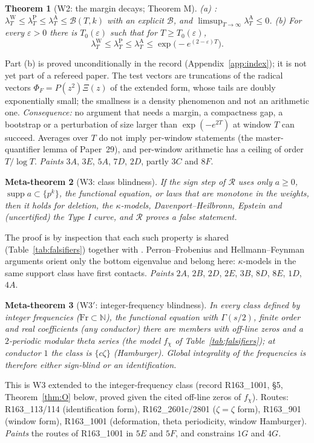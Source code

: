 \documentclass[11pt]{amsart}
\newtheorem{theorem}{Theorem}[section]
\newtheorem{metatheorem}[theorem]{Meta-theorem}
\theoremstyle{definition}
\theoremstyle{remark}
\newcommand{\N}{\mathbb N}
\newcommand{\supp}{\operatorname{supp}}
\newcommand{\lamA}{\lambda^{\mathrm A}_T}
\newcommand{\lamW}{\lambda^{\mathrm W}_T}
\begin{document}
\begin{theorem}[W2: the margin decays; Theorem M]\label{thm:M}
(a) \cite[Thm.~11.5]{Paper47}: $\lamW\le\lambda^{\mathrm P}_T\le\lamA\le\mathcal B(T,k)$ with an
explicit $\mathcal B$, and $\limsup_{T\to\infty}\lamA\le0$.
(b) For every $\varepsilon>0$ there is $T_0(\varepsilon)$ such that for $T\ge T_0(\varepsilon)$,
\[
\lamW\le\lambda^{\mathrm P}_T\le\lamA\le\exp\!\big(-e^{(2-\varepsilon)T}\big).
\]
\end{theorem}
\noindent Part (b) is proved unconditionally in the record (Appendix~\ref{app:index}); it is not yet part of a
refereed paper. The test vectors are truncations of the radical vectors $\Phi_F=P(z^2)\Xi(z)$ of the
extended form, whose tails are doubly exponentially small; the smallness is a density phenomenon and not
an arithmetic one. \emph{Consequence:} no argument that needs a margin, a compactness gap, a bootstrap or
a perturbation of size larger than $\exp(-e^{2T})$ at window $T$ can succeed. Averages over $T$ do not
imply per-window statements (the master-quantifier lemma of Paper~29), and per-window arithmetic has a
ceiling of order $T/\log T$.
\emph{Paints} $3A$, $3E$, $5A$, $7D$, $2D$, partly $3C$ and $8F$.

\begin{metatheorem}[W3: class blindness]\label{W3}
If the sign step of $\mathcal R$ uses only $a\ge0$, $\supp a\subset\{p^k\}$, the functional equation, or laws
that are monotone in the weights, then it holds for deletion, the $\kappa$-models, Davenport--Heilbronn,
Epstein and (uncertified) the Type I curve, and $\mathcal R$ proves a false statement.
\end{metatheorem}
\noindent The proof is by inspection that each such property is shared (Table~\ref{tab:falsifiers}) together with
\cite[Thm.~12.5]{Paper47}. Perron--Frobenius and Hellmann--Feynman arguments orient only the
bottom eigenvalue and belong here: $\kappa$-models in the same support class have first contacts.
\emph{Paints} $2A$, $2B$, $2D$, $2E$, $3B$, $8D$, $8E$, $1D$, $4A$.

\begin{metatheorem}[W3$'$: integer-frequency blindness]\label{W3prime}
In every class defined by integer frequencies ($\mathrm{Fr}\subset\N$), the functional equation with $\Gamma(s/2)$,
finite order and real coefficients (any conductor) there are members with off-line zeros and a $2$-periodic
modular theta series (the model $f_\chi$ of Table~\ref{tab:falsifiers}); at conductor $1$ the class is $\{c\zeta\}$
(Hamburger). Global integrality of the frequencies is therefore either sign-blind or an identification.
\end{metatheorem}
\noindent This is W3 extended to the integer-frequency class (record R163\_1001, \S5, Theorem~\ref{thm:O} below,
proved given the cited off-line zeros of $f_\chi$). Routes: R163\_113/114 (identification form), R162\_2601c/2801
($\zeta=\zeta$ form), R163\_901 (window form), R163\_1001 (deformation, theta periodicity, window Hamburger).
\emph{Paints} the routes of R163\_1001 in $5E$ and $5F$, and constrains $1G$ and $4G$.
\end{document}
